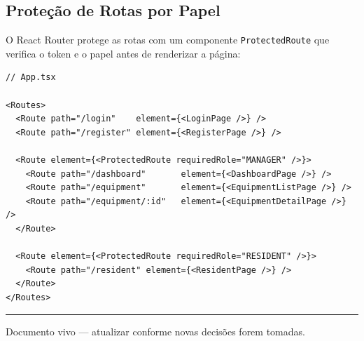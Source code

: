 \documentclass[12pt, a4paper]{article}
\begin{document}
\subsection{Proteção de Rotas por Papel}

O React Router protege as rotas com um componente \texttt{ProtectedRoute}
que verifica o token e o papel antes de renderizar a página:

\begin{verbatim}
// App.tsx

<Routes>
  <Route path="/login"    element={<LoginPage />} />
  <Route path="/register" element={<RegisterPage />} />

  <Route element={<ProtectedRoute requiredRole="MANAGER" />}>
    <Route path="/dashboard"       element={<DashboardPage />} />
    <Route path="/equipment"       element={<EquipmentListPage />} />
    <Route path="/equipment/:id"   element={<EquipmentDetailPage />} />
  </Route>

  <Route element={<ProtectedRoute requiredRole="RESIDENT" />}>
    <Route path="/resident" element={<ResidentPage />} />
  </Route>
</Routes>
\end{verbatim}

\vspace{1cm}
\hrule
\vspace{0.3cm}
{\small\color{gray} Documento vivo — atualizar conforme novas decisões forem tomadas.}
\end{document}
